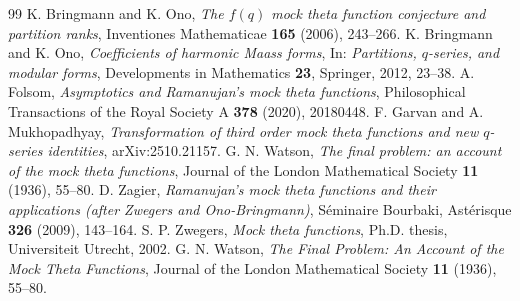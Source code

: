 \documentclass[10pt,a4paper]{amsart}
\begin{document}
\begin{thebibliography}{99}
 K. Bringmann and K. Ono, \emph{The $f(q)$ mock theta function conjecture and partition ranks}, Inventiones Mathematicae \textbf{165} (2006), 243--266.
 K. Bringmann and K. Ono, \emph{Coefficients of harmonic Maass forms}, In: \emph{Partitions, $q$-series, and modular forms}, Developments in Mathematics \textbf{23}, Springer, 2012, 23--38.
 A. Folsom, \emph{Asymptotics and Ramanujan's mock theta functions}, Philosophical Transactions of the Royal Society A \textbf{378} (2020), 20180448.
 F. Garvan and A. Mukhopadhyay, \emph{Transformation of third order mock theta functions and new $q$-series identities}, arXiv:2510.21157.
 G. N. Watson, \emph{The final problem: an account of the mock theta functions}, Journal of the London Mathematical Society \textbf{11} (1936), 55--80.
 D. Zagier, \emph{Ramanujan's mock theta functions and their applications (after Zwegers and Ono-Bringmann)}, S\'eminaire Bourbaki, Ast\'erisque \textbf{326} (2009), 143--164.
 S. P. Zwegers, \emph{Mock theta functions}, Ph.D. thesis, Universiteit Utrecht, 2002. G. N. Watson, \emph{The Final Problem: An Account of the Mock Theta Functions}, Journal of the London Mathematical Society \textbf{11} (1936), 55--80.
\end{thebibliography}
\end{document}
